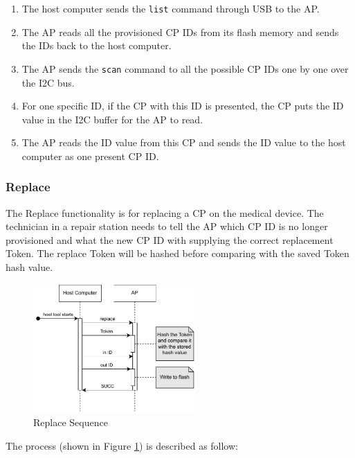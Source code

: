 \documentclass[11pt,oneside,onecolumn,letterpaper]{article}
\begin{document}
	\begin{enumerate}
		\item The host computer sends the \texttt{list} command through USB to the AP.
		\item The AP reads all the provisioned CP IDs from its flash memory and sends the IDs back to the host computer.
		\item The AP sends the \texttt{scan} command to all the possible CP IDs one by one over the I2C bus.
		\item For one specific ID,
		if the CP with this ID is presented,
		the CP puts the ID value in the I2C buffer for the AP to read.
		\item The AP reads the ID value from this CP and sends the ID value to the host computer as one present CP ID.
		
	\end{enumerate}
	
	\subsubsection{Replace}
	The Replace functionality is for replacing a CP on the medical device.
	The technician in a repair station needs to tell the AP which CP ID is no longer provisioned and what the new CP ID with supplying the correct replacement Token.
	The replace Token will be hashed before comparing with the saved Token hash value.
	
	\begin{figure}[h]
		\centering
		\includegraphics[width=0.55\textwidth]{pics/replace.pdf}
		\caption{Replace Sequence}
		\label{fig:functionality_replace}
	\end{figure}
	
	The process (shown in Figure \ref{fig:functionality_replace}) is described as follow:
	
\end{document}
